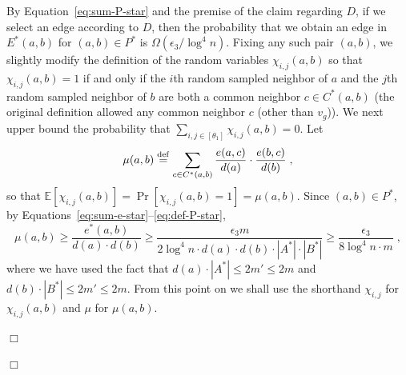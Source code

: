 \documentclass{article}
\newcommand{\eps}{\epsilon}
\newcommand{\Ex}{\mathbb{E}}
\newcommand{\eqdef}{\stackrel{\rm def}{=}}
\newenvironment{proof}{\smallskip\noindent{\bf Proof:}}%
        {\hspace*{\fill}$\Box$\par}
\newcommand{\commentt}[1]{ {}}
\newcommand{\talya}[1]{{} }
\begin{document}
\begin{proof}
\begin{proof}
By Equation~\eqref{eq:sum-P-star} and the premise of the claim regarding $D$, if we select an edge according to $D$, then the probability that we obtain an edge in $E^*(a,b)$ for $(a,b)\in P^{*}$ is %
$\Omega(\eps_3/\log^4 n)$.
Fixing any such pair $(a,b)$, we slightly modify the definition of the random variables $\chi_{i,j}(a,b)$ so that $\chi_{i,j}(a,b)=1$ if and only if the $i$th random sampled neighbor of $a$ and the $j$th random sampled neighbor of $b$ are both a common neighbor $c \in C^*(a,b)$ (the original definition allowed any common neighbor $c$ (other than $v_g$)). %
We next upper bound the probability that $\sum_{i,j\in [\theta_1]}\chi_{i,j}(a,b) =0$. 
Let 
\begin{equation}\label{eq:mu-def}
\mu(a,b)\eqdef \sum_{c\in C^*(a,b)}\frac{e(a,c)}{d(a)}\cdot \frac{e(b,c)}{d(b)}\;,
\end{equation}
so that $\Ex[\chi_{i,j}(a,b)] = \Pr[\chi_{i,j}(a,b)=1] = \mu(a,b)$.
Since $(a,b)\in P^*$,
by Equations~\eqref{eq:sum-e-star}--\eqref{eq:def-P-star},
\begin{equation}\label{eq:mu-lb}
\mu(a,b) \geq \frac{e^*(a,b)}{d(a)\cdot d(b)} \geq \frac{\eps_3 m}{2\log^4 n \cdot d(a)\cdot d(b)\cdot |A^*| \cdot |B^*|} \geq \frac{\eps_3 }{8 \log^4 n \cdot m}  \;,
\end{equation}
where we have used the fact that $d(a)\cdot |A^{*}| \leq 2m' \leq 2m$ and $d(b)\cdot |B^{*}| \leq 2m' \leq 2m$. 
From this point on we shall use the shorthand $\chi_{i,j}$ for $\chi_{i,j}(a,b)$ and $\mu$ for $\mu(a,b)$.


\end{proof}
\end{proof}
\end{document}
